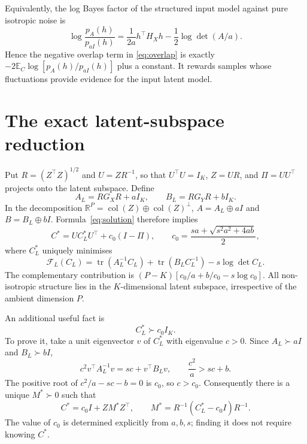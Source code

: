 \documentclass[11pt,a4paper]{article}
\newcommand{\tr}{\operatorname{tr}}
\newcommand{\E}{\mathbb E}
\newcommand{\R}{\mathbb R}
\newcommand{\F}{\mathcal F}
\begin{document}
Equivalently, the log Bayes factor of the structured input model against
pure isotropic noise is
\begin{equation}
 \log\frac{p_A(h)}{p_{aI}(h)}
 =\frac1{2a}h^\top H_Xh-\frac12\log\det(A/a).
\end{equation}
Hence the negative overlap term in \eqref{eq:overlap} is exactly
$-2\E_C\log[p_A(h)/p_{aI}(h)]$ plus a constant. It rewards samples whose
fluctuations provide evidence for the input latent model.

\section{The exact latent-subspace reduction}\label{sec:reduction}
Put $R=(Z^\top Z)^{1/2}$ and $U=ZR^{-1}$, so that $U^\top U=I_K$,
$Z=UR$, and $\Pi=UU^\top$ projects onto the latent subspace.
Define
\begin{equation}
 A_L=RG_XR+aI_K,\qquad B_L=RG_YR+bI_K.
\end{equation}
In the decomposition $\R^P=\operatorname{col}(Z)\oplus\operatorname{col}(Z)^\perp$,
$A=A_L\oplus aI$ and $B=B_L\oplus bI$.
Formula~\eqref{eq:solution} therefore implies
\begin{equation}\label{eq:blocks}
 C^*=UC_L^*U^\top+c_0(I-\Pi),\qquad
 c_0=\frac{sa+\sqrt{s^2a^2+4ab}}2,
\end{equation}
where $C_L^*$ uniquely minimises
\begin{equation}\label{eq:FL}
 \F_L(C_L)=\tr(A_L^{-1}C_L)+\tr(B_LC_L^{-1})-s\log\det C_L.
\end{equation}
The complementary contribution is
$(P-K)[c_0/a+b/c_0-s\log c_0]$.
All non-isotropic structure lies in the $K$-dimensional latent subspace,
irrespective of the ambient dimension $P$.

An additional useful fact is
\begin{equation}\label{eq:floor}
 C_L^*\succ c_0I_K.
\end{equation}
To prove it, take a unit eigenvector $v$ of $C_L^*$ with eigenvalue $c>0$.
Since $A_L\succ aI$ and $B_L\succ bI$,
\begin{equation}
 c^2v^\top A_L^{-1}v=sc+v^\top B_Lv,
 \qquad \frac{c^2}{a}>sc+b.
\end{equation}
The positive root of $c^2/a-sc-b=0$ is $c_0$, so $c>c_0$.
Consequently there is a unique $M^*\succ0$ such that
\begin{equation}\label{eq:M}
 C^*=c_0I+ZM^*Z^\top,\qquad
 M^*=R^{-1}(C_L^*-c_0I)R^{-1}.
\end{equation}
The value of $c_0$ is determined explicitly from $a,b,s$; finding it does
not require knowing $C^*$.
\end{document}
